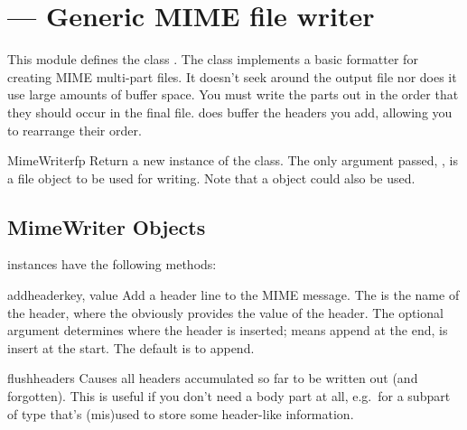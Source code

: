 \section{ ---
         Generic MIME file writer}




This module defines the class .  The
 class implements a basic formatter for creating
MIME multi-part files.  It doesn't seek around the output file nor
does it use large amounts of buffer space. You must write the parts
out in the order that they should occur in the final
file.  does buffer the headers you add, allowing you 
to rearrange their order.

\begin{classdesc}{MimeWriter}{fp}
Return a new instance of the  class.  The only
argument passed, , is a file object to be used for
writing. Note that a  object could also be used.
\end{classdesc}


\subsection{MimeWriter Objects \label{MimeWriter-objects}}


 instances have the following methods:

\begin{methoddesc}{addheader}{key, value}
Add a header line to the MIME message. The  is the name of
the header, where the  obviously provides the value of the
header. The optional argument  determines where the header 
is inserted;  means append at the end,  is insert at
the start. The default is to append.
\end{methoddesc}

\begin{methoddesc}{flushheaders}{}
Causes all headers accumulated so far to be written out (and
forgotten). This is useful if you don't need a body part at all,
e.g.\ for a subpart of type  that's (mis)used
to store some header-like information.
\end{methoddesc}

